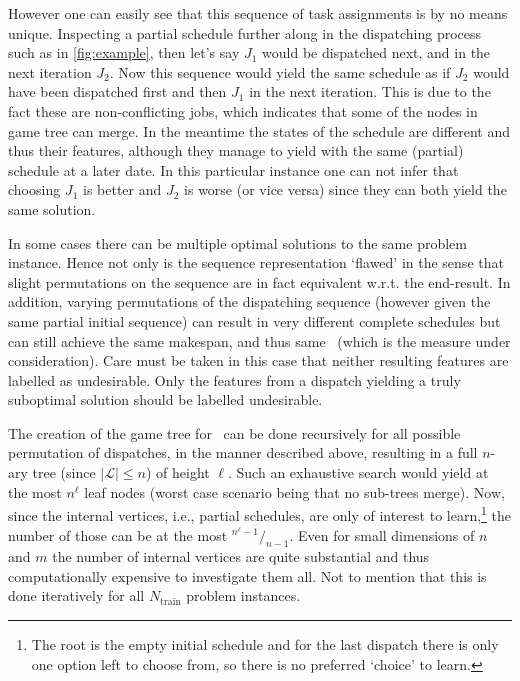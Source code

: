 However one can easily see that this sequence of task assignments is by no means unique. 
Inspecting a partial schedule further along in the dispatching process such as in \cref{fig:example}, then let's say $J_1$ would be dispatched next, and in the next iteration $J_2$. 
Now this sequence would yield the same schedule as if $J_2$ would have been dispatched first and then $J_1$ in the next iteration. 
This is due to the fact these are non-conflicting jobs, which indicates that some of the nodes in game tree can merge. 
In the meantime the states of the schedule are different and thus their features, although they manage to yield with the same (partial) schedule at a later date.  %
In this particular instance one can not infer that choosing $J_1$ is better and $J_2$ is worse (or vice versa) since they can both yield the same solution.

In some cases there can be multiple optimal solutions to the same problem instance. 
Hence not only is the sequence representation `flawed' in the sense that slight permutations on the sequence are in fact equivalent w.r.t. the end-result.
In addition, varying permutations of the dispatching sequence (however given the same partial initial sequence) can result in very different complete schedules but can still achieve the same makespan, and thus same \fullnamerho\ (which is the measure under consideration). 
Care must be taken in this case that neither resulting features are labelled as undesirable. 
Only the features from a dispatch yielding a truly suboptimal solution should be labelled undesirable. 

The creation of the game tree for \jsp\ can be done recursively for all 
possible permutation of dispatches, in the manner described above, resulting in 
a full \mbox{$n$-ary} tree (since $|\mathcal{L}|\leq n$) of height $\ell$. Such 
an exhaustive search would yield at the most $n^{\ell}$ leaf nodes (worst case 
scenario being that no sub-trees merge). Now, since the internal vertices, 
i.e., partial schedules, are only of interest to learn,\footnote{The root is 
the empty initial schedule and for the last dispatch there is only one option 
left to choose from, so there is no preferred `choice' to learn.} the number of 
those can be at the most \mbox{${}^{n^{\ell}-1}/_{n-1}$}.
Even for small dimensions of $n$ and $m$ the number of internal vertices are quite substantial and thus computationally expensive to investigate them all. Not to mention that this is done iteratively for all $N_{\text{train}}$ problem instances.

